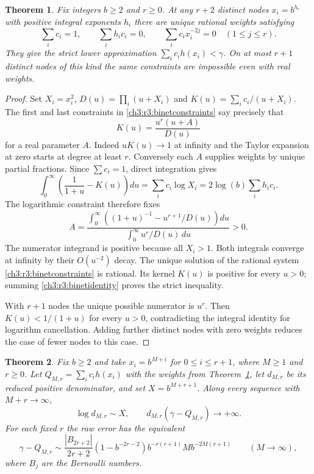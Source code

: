 \documentclass[11pt,a4paper,oneside,openany]{report}
\newtheorem{theorem}{Theorem}[section]
\theoremstyle{remark}\newtheorem{remark}[theorem]{Remark}
\numberwithin{equation}{section}
\begin{document}
\begin{theorem}\label{ch3:r3:binetminimum}
Fix integers $b\ge2$ and $r\ge0$. At any $r+2$ distinct nodes
$x_i=b^{h_i}$ with positive integral exponents $h_i$ there are unique
rational weights satisfying
\begin{equation}\label{ch3:r3:binetconstraints}
 \sum_i c_i=1,\qquad \sum_i h_ic_i=0,\qquad
 \sum_i c_ix_i^{-2j}=0\quad(1\le j\le r).
\end{equation}
They give the strict lower approximation
$\sum_i c_i h(x_i)<\gamma$. On at most $r+1$ distinct nodes of this
kind the same constraints are impossible even with real weights.
\end{theorem}

\begin{proof}
Set $X_i=x_i^2$, $D(u)=\prod_i(u+X_i)$ and
$K(u)=\sum_i c_i/(u+X_i)$. The first and last constraints in
\eqref{ch3:r3:binetconstraints} say precisely that
\[
 K(u)=\frac{u^r(u+A)}{D(u)}
\]
for a real parameter $A$. Indeed $uK(u)\to1$ at infinity and
the Taylor expansion at zero starts at degree at least $r$.
Conversely each $A$ supplies weights by unique partial fractions.
Since $\sum c_i=1$, direct integration gives
\[
 \int_0^\infty\left(\frac1{1+u}-K(u)\right)du
 =\sum_i c_i\log X_i=2\log(b)\sum_i h_i c_i.
\]
The logarithmic constraint therefore fixes
\[
 A=\frac{\displaystyle\int_0^\infty
    \left((1+u)^{-1}-u^{r+1}/D(u)\right)du}
   {\displaystyle\int_0^\infty u^r/D(u)\,du}>0 .
\]
The numerator integrand is positive because all $X_i>1$.
Both integrals converge at infinity by their $O(u^{-2})$ decay.
The unique solution of the rational system
\eqref{ch3:r3:binetconstraints} is rational. Its kernel $K(u)$ is
positive for every $u>0$; summing \eqref{ch3:r3:binetidentity} proves
the strict inequality.

With $r+1$ nodes the unique possible numerator is $u^r$.
Then $K(u)<1/(1+u)$ for every $u>0$, contradicting the integral
identity for logarithm cancellation. Adding further distinct nodes
with zero weights reduces the case of fewer nodes to this case.
\end{proof}

\begin{theorem}\label{ch3:r3:binetmoving}
Fix $b\ge2$ and take $x_i=b^{M+i}$ for $0\le i\le r+1$,
where $M\ge1$ and $r\ge0$. Let $Q_{M,r}=\sum_i c_i h(x_i)$ with
the weights from Theorem~\ref{ch3:r3:binetminimum}, let $d_{M,r}$ be
its reduced positive denominator, and set $X=b^{M+r+1}$.
Along every sequence with $M+r\to\infty$,
\[
 \log d_{M,r}\sim X,
 \qquad d_{M,r}(\gamma-Q_{M,r})\longrightarrow+\infty.
\]
For each fixed $r$ the raw error has the equivalent
\[
 \gamma-Q_{M,r}\sim
 \frac{|B_{2r+2}|}{2r+2}
 (1-b^{-2r-2})b^{-r(r+1)}M b^{-2M(r+1)}
 \qquad(M\to\infty),
\]
where $B_j$ are the Bernoulli numbers.
\end{theorem}
\end{document}
